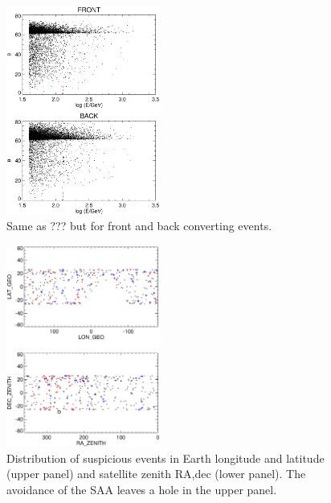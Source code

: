 \documentclass[aps,twocolumn,prd,superscriptaddress,showpacs,nofootinbib,fixfloat]{revtex4}
\begin{document}
\begin{figure}[p]
\centering
\includegraphics[width=0.45\textwidth]{plots/theta-E-frontback.ps}
\caption{Same as ??? but for front and back converting events.}
\label{fig:theta-E-frontback}
\end{figure}

\begin{figure}[p]
\centering
\includegraphics[width=0.45\textwidth]{plots/geo-lonlat.ps}
\caption{Distribution of suspicious events in Earth longitude and latitude
(upper panel) and satellite zenith RA,dec (lower panel).   The
avoidance of the SAA leaves a hole in the upper panel.}
\label{fig:geo-lonlat}
\end{figure}
\end{document}
